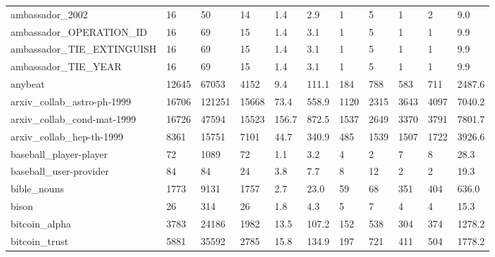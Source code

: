 \begin{longtable}{lllllllllll}
 ambassador\_2002                                    & 16         & 50        & 14    & 1.4    & 2.9    & 1     & 5      & 1      & 2      & 9.0     \\
 ambassador\_OPERATION\_ID                            & 16         & 69        & 15    & 1.4    & 3.1    & 1     & 5      & 1      & 1      & 9.9     \\
 ambassador\_TIE\_EXTINGUISH                          & 16         & 69        & 15    & 1.4    & 3.1    & 1     & 5      & 1      & 1      & 9.9     \\
 ambassador\_TIE\_YEAR                                & 16         & 69        & 15    & 1.4    & 3.1    & 1     & 5      & 1      & 1      & 9.9     \\
 anybeat                                            & 12645      & 67053     & 4152  & 9.4    & 111.1  & 184   & 788    & 583    & 711    & 2487.6  \\
 arxiv\_collab\_astro-ph-1999                         & 16706      & 121251    & 15668 & 73.4   & 558.9  & 1120  & 2315   & 3643   & 4097   & 7040.2  \\
 arxiv\_collab\_cond-mat-1999                         & 16726      & 47594     & 15523 & 156.7  & 872.5  & 1537  & 2649   & 3370   & 3791   & 7801.7  \\
 arxiv\_collab\_hep-th-1999                           & 8361       & 15751     & 7101  & 44.7   & 340.9  & 485   & 1539   & 1507   & 1722   & 3926.6  \\
 baseball\_player-player                             & 72         & 1089      & 72    & 1.1    & 3.2    & 4     & 2      & 7      & 8      & 28.3    \\
 baseball\_user-provider                             & 84         & 84        & 24    & 3.8    & 7.7    & 8     & 12     & 2      & 2      & 19.3    \\
 bible\_nouns                                        & 1773       & 9131      & 1757  & 2.7    & 23.0   & 59    & 68     & 351    & 404    & 636.0   \\
 bison                                              & 26         & 314       & 26    & 1.8    & 4.3    & 5     & 7      & 4      & 4      & 15.3    \\
 bitcoin\_alpha                                      & 3783       & 24186     & 1982  & 13.5   & 107.2  & 152   & 538    & 304    & 374    & 1278.2  \\
 bitcoin\_trust                                      & 5881       & 35592     & 2785  & 15.8   & 134.9  & 197   & 721    & 411    & 504    & 1778.2  \\

\end{longtable}
